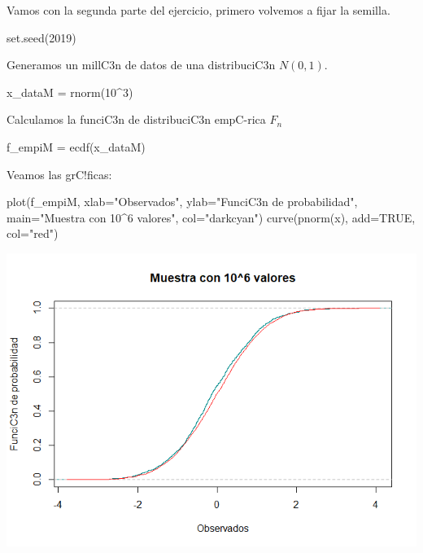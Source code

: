 \documentclass[
]{article}
\newenvironment{Shaded}{\begin{snugshade}}{\end{snugshade}}
\newcommand{\AttributeTok}[1]{\textcolor[rgb]{0.77,0.63,0.00}{#1}}
\newcommand{\ConstantTok}[1]{\textcolor[rgb]{0.00,0.00,0.00}{#1}}
\newcommand{\DecValTok}[1]{\textcolor[rgb]{0.00,0.00,0.81}{#1}}
\newcommand{\FunctionTok}[1]{\textcolor[rgb]{0.00,0.00,0.00}{#1}}
\newcommand{\NormalTok}[1]{#1}
\newcommand{\OtherTok}[1]{\textcolor[rgb]{0.56,0.35,0.01}{#1}}
\newcommand{\SpecialCharTok}[1]{\textcolor[rgb]{0.00,0.00,0.00}{#1}}
\newcommand{\StringTok}[1]{\textcolor[rgb]{0.31,0.60,0.02}{#1}}
\begin{document}
Vamos con la segunda parte del ejercicio, primero volvemos a fijar la
semilla.

\begin{Shaded}
\begin{Highlighting}[]
\FunctionTok{set.seed}\NormalTok{(}\DecValTok{2019}\NormalTok{)}
\end{Highlighting}
\end{Shaded}

Generamos un millC3n de datos de una distribuciC3n \(N(0,1)\).

\begin{Shaded}
\begin{Highlighting}[]
\NormalTok{x\_dataM }\OtherTok{=} \FunctionTok{rnorm}\NormalTok{(}\DecValTok{10}\SpecialCharTok{\^{}}\DecValTok{3}\NormalTok{)}
\end{Highlighting}
\end{Shaded}

Calculamos la funciC3n de distribuciC3n empC-rica \(F_{n}\)

\begin{Shaded}
\begin{Highlighting}[]
\NormalTok{f\_empiM }\OtherTok{=} \FunctionTok{ecdf}\NormalTok{(x\_dataM)}
\end{Highlighting}
\end{Shaded}

Veamos las grC!ficas:

\begin{Shaded}
\begin{Highlighting}[]
\FunctionTok{plot}\NormalTok{(f\_empiM, }\AttributeTok{xlab=}\StringTok{"Observados"}\NormalTok{, }\AttributeTok{ylab=}\StringTok{"FunciC3n de probabilidad"}\NormalTok{, }
     \AttributeTok{main=}\StringTok{"Muestra con 10\^{}6 valores"}\NormalTok{, }\AttributeTok{col=}\StringTok{"darkcyan"}\NormalTok{)}
\FunctionTok{curve}\NormalTok{(}\FunctionTok{pnorm}\NormalTok{(x), }\AttributeTok{add=}\ConstantTok{TRUE}\NormalTok{, }\AttributeTok{col=}\StringTok{"red"}\NormalTok{)}
\end{Highlighting}
\end{Shaded}

\includegraphics{Pruebas_p_files/figure-html/unnamed-chunk-56-1.png}
\end{document}
